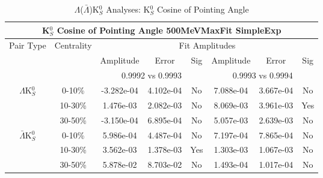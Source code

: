 \documentclass[../AnalysisNoteJBuxton.tex]{subfiles}
\begin{document}
\begin{table}
 \centering
 \begin{tabular}{|c|c|c|c|c||c|c|c|}
  \multicolumn{8}{c}{K$^{0}_{S}$ Cosine of Pointing Angle 500MeVMaxFit SimpleExp} \\
  \hline
  \multirow{3}{*}{Pair Type} & \multirow{3}{*}{Centrality} & \multicolumn{6}{c|}{Fit Amplitudes} \\
  \cline{3-8}
   & & Amplitude & Error & Sig & Amplitude & Error & Sig \\  
  \cline{3-8}
   & & \multicolumn{3}{c||}{0.9992 vs 0.9993} & \multicolumn{3}{c|}{0.9993 vs 0.9994} \\  
  \hline  
  \multirow{3}{*}{$\Lambda$K$^{0}_{S}$}  
   &  0-10\% & -3.282e-04 & 4.102e-04 & No & 7.088e-04 & 3.667e-04 & No \\
   & 10-30\% & 1.476e-03 & 2.082e-03 & No & 8.069e-03 & 3.961e-03 & Yes \\
   & 30-50\% & -3.150e-04 & 6.895e-04 & No & 5.057e-03 & 2.639e-03 & No \\
  \hline  
  \multirow{3}{*}{$\bar{\Lambda}$K$^{0}_{S}$}  
   &  0-10\% & 5.986e-04 & 4.487e-04 & No & 7.197e-04 & 7.865e-04 & No \\
   & 10-30\% & 3.562e-03 & 1.378e-03 & Yes & 1.303e-03 & 1.067e-03 & No \\
   & 30-50\% & 5.878e-02 & 8.703e-02 & No & 1.493e-04 & 1.017e-04 & No \\
  \hline
 \end{tabular}
 \caption{$\Lambda$($\bar{\Lambda}$)K$^{0}_{S}$ Analyses: K$^{0}_{S}$ Cosine of Pointing Angle}
 \label{tab:K0CosPointingAngleLamK0_500MeVMaxFit_SimpleExp}
\end{table}





\clearpage
\end{document}
